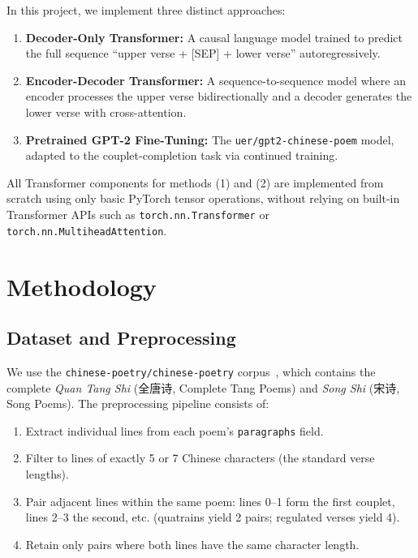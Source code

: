 \documentclass[11pt,a4paper]{article}
\begin{document}
In this project, we implement three distinct approaches:
\begin{enumerate}[nosep]
    \item \textbf{Decoder-Only Transformer:} A causal language model trained
          to predict the full sequence ``upper verse + [SEP] + lower verse''
          autoregressively.
    \item \textbf{Encoder-Decoder Transformer:} A sequence-to-sequence model
          where an encoder processes the upper verse bidirectionally and a
          decoder generates the lower verse with cross-attention.
    \item \textbf{Pretrained GPT-2 Fine-Tuning:}
          The \texttt{uer/gpt2-chinese-poem} model, adapted to the
          couplet-completion task via continued training.
\end{enumerate}

All Transformer components for methods (1) and (2) are implemented from
scratch using only basic PyTorch tensor operations, without relying on
built-in Transformer APIs such as \texttt{torch.nn.Transformer} or
\texttt{torch.nn.MultiheadAttention}.

\section{Methodology}
\label{sec:method}

\subsection{Dataset and Preprocessing}

We use the \texttt{chinese-poetry/chinese-poetry}
corpus~\cite{chinese-poetry}, which contains the complete
\emph{Quan Tang Shi} (全唐诗, Complete Tang Poems) and
\emph{Song Shi} (宋诗, Song Poems).
The preprocessing pipeline consists of:

\begin{enumerate}[nosep]
    \item Extract individual lines from each poem's \texttt{paragraphs} field.
    \item Filter to lines of exactly 5 or 7 Chinese characters (the standard
          verse lengths).
    \item Pair adjacent lines within the same poem: lines 0--1 form the first
          couplet, lines 2--3 the second, etc.
          (quatrains yield 2 pairs; regulated verses yield 4).
    \item Retain only pairs where both lines have the same character length.
\end{enumerate}
\end{document}
